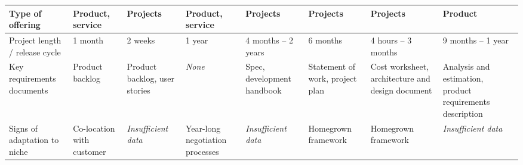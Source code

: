 \begin{landscape}
\begin{table}[tbp]
{\begin{tabular}{p{2.3cm}p{2.3cm}p{2.3cm}p{2.3cm}p{2.3cm}p{2.3cm}p{2.3cm}p{2.3cm}}
\hline
\vspace{0.5pt} Type of offering & \vspace{0.5pt} Product, service & \vspace{0.5pt} Projects & \vspace{0.5pt} Product, service & \vspace{0.5pt} Projects & \vspace{0.5pt} Projects & \vspace{0.5pt} Projects & \vspace{0.5pt} Product \\
\hline
\vspace{0.5pt} Project length / release cycle & \vspace{0.5pt} 1 month & \vspace{0.5pt} 2 weeks & \vspace{0.5pt} 1 year & \vspace{0.5pt} 4 months -- 2 years & \vspace{0.5pt} 6 months & \vspace{0.5pt} 4 hours -- 3 months & \vspace{0.5pt} 9 months -- 1 year \\
\hline
\vspace{0.5pt} Key requirements documents & \vspace{0.5pt} Product backlog & \vspace{0.5pt} Product backlog, user stories & \vspace{0.5pt} \emph{None} & \vspace{0.5pt} Spec, development handbook & \vspace{0.5pt} Statement of work, project plan & \vspace{0.5pt} Cost worksheet, architecture and design document & \vspace{0.5pt} Analysis and estimation, product requirements description \\
\hline
\vspace{0.5pt} Signs of adaptation to niche & \vspace{0.5pt} Co-location with customer & \vspace{0.5pt} \emph{Insufficient data} & \vspace{0.5pt} Year-long negotiation processes & \vspace{0.5pt} \emph{Insufficient data} & \vspace{0.5pt} Homegrown framework & \vspace{0.5pt} Homegrown framework & \vspace{0.5pt} \emph{Insufficient data} \\

\end{tabular}}
\end{table}
\end{landscape}
